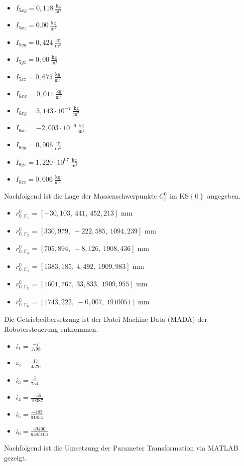 \begin{itemize}
	\item $I_{5xy} = 0,118~\frac{\text{kg}}{\text{m}^2}$
	\item $I_{5xz} = 0.00~\frac{\text{kg}}{\text{m}^2}$
	\item $I_{5yy} = 0,424~\frac{\text{kg}}{\text{m}^2}$
	\item $I_{5yz} = 0,00~\frac{\text{kg}}{\text{m}^2}$
	\item $I_{5zz} = 0,675~\frac{\text{kg}}{\text{m}^2}$
	\\
	\item $I_{6xx} = 0,011~\frac{\text{kg}}{\text{m}^2}$
	\item $I_{6xy} = 5,143\cdot10^{-7}~\frac{\text{kg}}{\text{m}^2}$
	\item $I_{6xz} = -2,003\cdot10^{-6}~\frac{\text{kg}}{\text{m}^2}$
	\item $I_{6yy} = 0,006~\frac{\text{kg}}{\text{m}^2}$
	\item $I_{6yz} = 1,220\cdot10^{07}~\frac{\text{kg}}{\text{m}^2}$
	\item $I_{6zz} = 0,006~\frac{\text{kg}}{\text{m}^2}$
\end{itemize}
%
Nachfolgend ist die Lage der Massenschwerpunkte $C_i^0$ im KS$\left\{0\right\}$ angegeben. 
% 
\begin{itemize}
	\item $r_{0,C_1}^0$ = $\left[-30,103,~441,~452,213\right]$ mm
	\item $r_{0,C_2}^0$ = $\left[330,979,~-222,585,~1094,239\right]$ mm
	\item $r_{0,C_3}^0$ = $\left[705,894,~-8,126,~1908,436\right]$ mm
	\item $r_{0,C_4}^0$ = $\left[1383,185,~4,492,~1909,983\right]$ mm
	\item $r_{0,C_5}^0$ = $\left[1601,767,~33,833,~1909,955\right]$ mm
	\item $r_{0,C_6}^0$ = $\left[1743,222,~-0,007,~1910 051\right]$ mm
\end{itemize}
%
Die Getriebeübersetzung ist der Datei Machine Data (MADA) der Robotersteuerung entnommen.
%
\begin{itemize}
	\item $i_1 = \frac{-7}{1798}$
	\item $i_2 = \frac{17}{4576}$
	\item $i_3 = \frac{3}{754}$
	\item $i_4 = \frac{-55}{10387}$
	\item $i_5 = \frac{-483}{91834}$
	\item $i_6 = \frac{49400}{6485103}$
\end{itemize}
%
Nachfolgend ist die Umsetzung der Parameter Transformation via MATLAB\textsuperscript{\textregistered} gezeigt. 
%

%
\setcounter{chapter}{2}
\setcounter{section}{3}
\setcounter{table}{0}
\setcounter{figure}{0}
%

